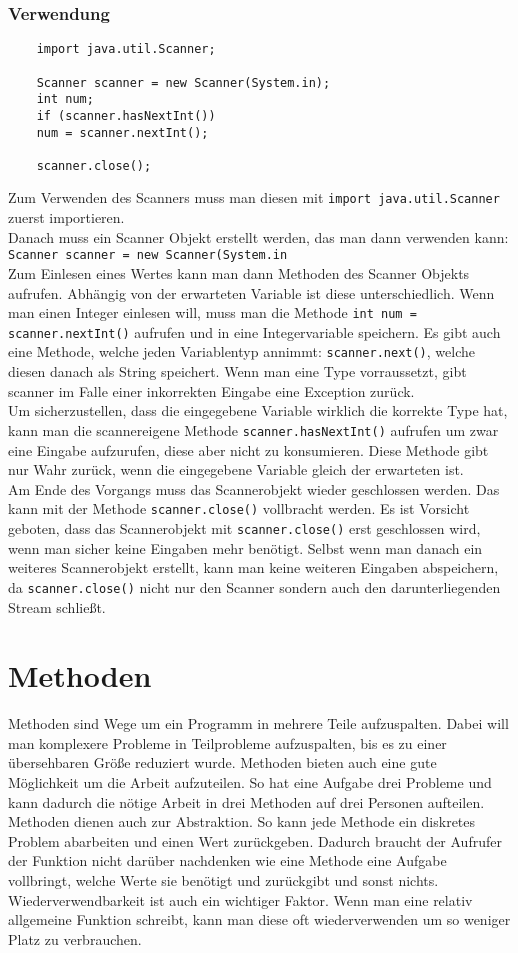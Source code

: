 \documentclass{article}
\begin{document}
	\subsubsection{Verwendung}
	\begin{verbatim}
	import java.util.Scanner;

	Scanner scanner = new Scanner(System.in);
	int num;
	if (scanner.hasNextInt())
	num = scanner.nextInt();

	scanner.close();
	\end{verbatim}
	Zum Verwenden des Scanners muss man diesen mit \verb|import java.util.Scanner| zuerst importieren. \\
	Danach muss ein Scanner Objekt erstellt werden, das man dann verwenden kann: \verb|Scanner scanner = new Scanner(System.in| \\
	Zum Einlesen eines Wertes kann man dann Methoden des Scanner Objekts aufrufen. Abhängig von der erwarteten Variable ist diese unterschiedlich. Wenn man einen Integer einlesen will, muss man die Methode \verb|int num = scanner.nextInt()| aufrufen und in eine Integervariable speichern. Es gibt auch eine Methode, welche jeden Variablentyp annimmt: \verb|scanner.next()|, welche diesen danach als String speichert. Wenn man eine Type vorraussetzt, gibt scanner im Falle einer inkorrekten Eingabe eine Exception zurück.\\
	Um sicherzustellen, dass die eingegebene Variable wirklich die korrekte Type hat, kann man die scannereigene Methode \verb|scanner.hasNextInt()| aufrufen um zwar eine Eingabe aufzurufen, diese aber nicht zu konsumieren. Diese Methode gibt nur Wahr zurück, wenn die eingegebene Variable gleich der erwarteten ist. \\
	Am Ende des Vorgangs muss das Scannerobjekt wieder geschlossen werden. Das kann mit der Methode \verb|scanner.close()| vollbracht werden. Es ist Vorsicht geboten, dass das Scannerobjekt mit \verb|scanner.close()| erst geschlossen wird, wenn man sicher keine Eingaben mehr benötigt. Selbst wenn man danach ein weiteres Scannerobjekt erstellt, kann man keine weiteren Eingaben abspeichern, da \verb|scanner.close()| nicht nur den Scanner sondern auch den darunterliegenden Stream schließt.
	\section{Methoden}
	Methoden sind Wege um ein Programm in mehrere Teile aufzuspalten. Dabei will man komplexere Probleme in Teilprobleme aufzuspalten, bis es zu einer übersehbaren Größe reduziert wurde. Methoden bieten auch eine gute Möglichkeit um die Arbeit aufzuteilen. So hat eine Aufgabe drei Probleme und kann dadurch die nötige Arbeit in drei Methoden auf drei Personen aufteilen. \\
	Methoden dienen auch zur Abstraktion. So kann jede Methode ein diskretes Problem abarbeiten und einen Wert zurückgeben. Dadurch braucht der Aufrufer der Funktion nicht darüber nachdenken wie eine Methode eine Aufgabe vollbringt, welche Werte sie benötigt und zurückgibt und sonst nichts. \\
	Wiederverwendbarkeit ist auch ein wichtiger Faktor. Wenn man eine relativ allgemeine Funktion schreibt, kann man diese oft wiederverwenden um so weniger Platz zu verbrauchen. \\
\end{document}
